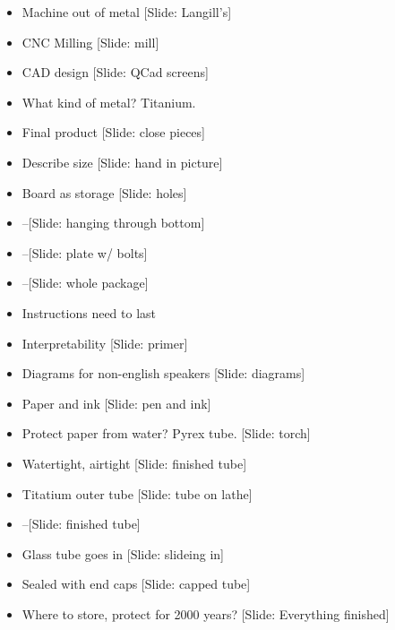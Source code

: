 \documentclass[12pt]{article}
\begin{document}
{\begin{itemize}
\item Machine out of metal [Slide: Langill's]

\item CNC Milling [Slide: mill]

\item CAD design [Slide: QCad screens]

\item What kind of metal?  Titanium.

\item Final product [Slide:  close pieces]

\item Describe size [Slide: hand in picture]

\item Board as storage [Slide: holes]
\item --[Slide: hanging through bottom]
\item --[Slide: plate w/ bolts]
\item --[Slide: whole package]

\item Instructions need to last

\item Interpretability [Slide: primer]

\item Diagrams for non-english speakers [Slide: diagrams]

\item Paper and ink [Slide: pen and ink]

\item Protect paper from water? Pyrex tube. [Slide: torch]

\item Watertight, airtight [Slide: finished tube]

\item Titatium outer tube [Slide: tube on lathe]

\item --[Slide: finished tube]

\item Glass tube goes in [Slide:  slideing in]

\item Sealed with end caps [Slide:  capped tube]

\item Where to store, protect for 2000 years? [Slide: Everything finished]


\end{itemize}}
\end{document}
